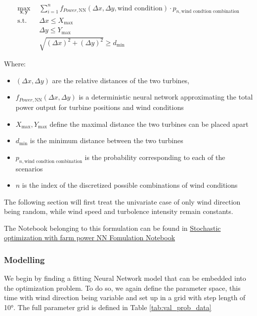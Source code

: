 \documentclass[preprint,12pt]{elsarticle}
\begin{document}
\begin{align}
	\max_{\mathbf{x}, \mathbf{y}} &  \sum_{i=1}^{n} f_{Power,\text{NN}}(\Delta x, \Delta y, \text{wind condition})\cdot p_{n,\text{wind condtion combination}} \\
	\text{s.t.} \quad 
	&  \Delta x \leq X_{\max} \\
	&  \Delta y \leq Y_{\max} \\
	& \sqrt{(\Delta x)^2 + (\Delta y)^2} \geq d_{\min}
\end{align}

Where:
\begin{itemize}
	\item \( (\Delta x, \Delta y) \) are the relative distances of the two turbines,
	\item \( f_{Power, \text{NN}}(\Delta x, \Delta y)\) is a deterministic neural network  approximating the total power output for turbine positions and wind conditions
	\item \(  X_{\max}, Y_{\max} \) define the maximal distance the two turbines can be placed apart
	\item \( d_{\min} \) is the minimum distance between the two turbines
	\item \(p_{n, \text{wind condtion combination}}\) is the probability corresponding to each of the scenarios
	\item \( n \) is the index of the discretized possible combinations of wind conditions 
\end{itemize}

The following section will first treat the univariate case of only wind direction being random, while wind speed and turbolence intensity remain constants. 

The Notebook belonging to this formulation can be found in \href{https://github.com/schmeti/uc3m_TFM_wind_farm_optimization_codebase/blob/main/Windfarm_power_modelling/0_two_turbine_problem_constrLearn_probweighted.ipynb}{Stochastic optimization with farm power NN Fomulation Notebook} \cite{schmetz2025twoturbine_stoch1}

\subsubsection{Modelling}

We begin by finding a fitting Neural Network model that can be embedded into the optimization problem. To do so, we again define the parameter space, this time with wind direction being variable and set up in a grid with step length of 10°. The full parameter grid is defined in Table \ref{tab:val_prob_data}
\end{document}
